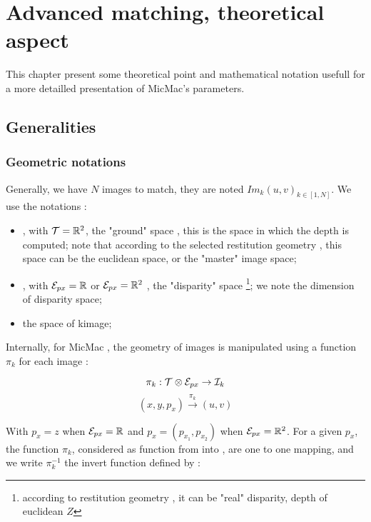 \chapter{Advanced matching, theoretical aspect}


This chapter present some theoretical point and mathematical notation 
usefull for  a more detailled presentation  of MicMac's parameters.


\section{Generalities}

\subsection{Geometric notations}

Generally, we have $N$  images to match, they are noted $Im_k(u,v)_{k\in [1,N]}$.
We use the notations :


\begin{itemize}
   \item \ETer,  with  $\ETer = \RR ^2$,  the "ground" space , this is
         the space in which the depth is computed; note that according
         to the selected restitution geometry , this space can be the 
         euclidean space, or the "master" image space;


   \item \EPx, with  $\EPx = \RR$ or   $\EPx = \RR ^2$ , the "disparity" space
          \footnote{according to restitution geometry , it can be "real" disparity, depth of euclidean $Z$};
          we note  \DimPx the dimension of disparity space;

   \item \EIm the space of  k\KTH image;
\end{itemize}


Internally, for MicMac , the geometry of images is manipulated using
a function  $\pi_k$ for each image : 

\begin{equation}
   \pi_k :   \ETer \otimes \EPx \rightarrow \EIm
\end{equation}
\begin{equation}
              (x,y,p_x)  \stackrel{\pi_k}{\rightarrow}  (u,v)
\end{equation}

With $p_x=z$ when $\EPx = \RR$ and   $p_x=(p_{x_1},p_{x_2})$
when $\EPx = \RR^2$. For a given  $p_x$,  the  function $\pi_k$,
considered as function from \ETer into  \EIm, are one to one mapping,
and we write    $\pi_k^{-1}$ the invert function defined by :


